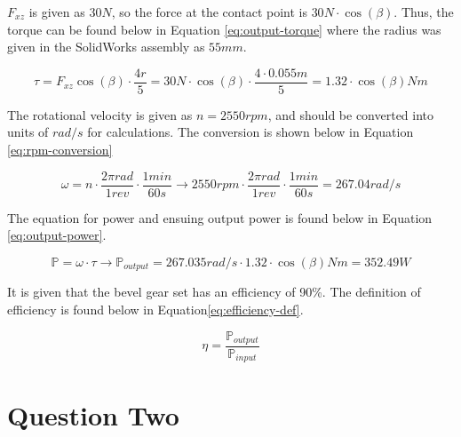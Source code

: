 \documentclass[12pt]{article}
\begin{document}
        $F_{xz}$ is given as $30N$, so the force at the contact point is $30N \cdot \cos(\beta)$. Thus, the torque can be found below in Equation \ref{eq:output-torque} where the 
        radius was given in the SolidWorks assembly as $55mm$.

        \begin{equation}
            \tau = F_{xz}\cos(\beta) \cdot \frac{4r}{5} = 30N \cdot \cos(\beta) \cdot \frac{4 \cdot 0.055m}{5} = 1.32 \cdot \cos(\beta)Nm
        \label{eq:output-torque}
        \end{equation}

        The rotational velocity is given as $n = 2550rpm$, and should be converted into units of $rad/s$ for calculations. The conversion is 
        shown below in Equation \ref{eq:rpm-conversion}

        \begin{equation}
            \omega = n\cdot \frac{2 \pi rad}{1 rev} \cdot \frac{1min}{60s} \rightarrow 2550rpm \cdot \frac{2 \pi rad}{1 rev} \cdot \frac{1min}{60s} = 267.04rad/s
        \label{eq:rpm-conversion}
        \end{equation}

        The equation for power and ensuing output power is found below in Equation \ref{eq:output-power}.

        \begin{equation}
           \mathbb{P} = \omega \cdot \tau \rightarrow \mathbb{P}_{output} = 267.035rad/s \cdot 1.32 \cdot \cos(\beta)Nm = 352.49W
        \label{eq:output-power}
        \end{equation}

        It is given that the bevel gear set has an efficiency of 90\%. The definition of efficiency is found below in Equation\ref{eq:efficiency-def}.

        \begin{equation}
            \eta = \frac{\mathbb{P}_{output}}{\mathbb{P}_{input}}
        \label{eq:efficiency-def}
        \end{equation}
    \section{Question Two}
\end{document}

